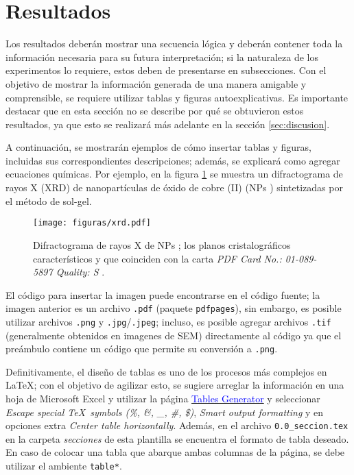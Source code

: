 \section{Resultados} %
\label{sec:resultados} %

Los resultados deberán mostrar una secuencia lógica y deberán contener toda la información necesaria para su futura interpretación; si la naturaleza de los experimentos lo requiere, estos deben de presentarse en subsecciones. Con el objetivo de mostrar la información generada de una manera amigable y comprensible, se requiere utilizar tablas y figuras autoexplicativas. Es importante destacar que en esta sección no se describe por qué se obtuvieron estos resultados, ya que esto se realizará más adelante en la sección \ref{sec:discusion}.

A continuación, se mostrarán ejemplos de cómo insertar tablas y figuras, incluidas sus correspondientes descripciones; además, se explicará como agregar ecuaciones químicas. Por ejemplo, en la figura \ref{fig:xrd} se muestra un difractograma de rayos X (XRD) de nanopartículas de óxido de cobre (II) (NPs ) sintetizadas por el método de sol-gel.

\begin{figure}[ht!]
    \centering
    \texttt{[image: figuras/xrd.pdf]}
    \caption{Difractograma de rayos X de NPs ; los planos cristalográficos característicos y que coinciden con la carta \textit{PDF Card No.: 01-089-5897 Quality: S} .}
    \label{fig:xrd}
\end{figure}

El código para insertar la imagen puede encontrarse en el código fuente; la imagen anterior es un archivo \texttt{.pdf} (paquete \texttt{pdfpages}), sin embargo, es posible utilizar archivos \texttt{.png} y \texttt{.jpg}/\texttt{.jpeg}; incluso, es posible agregar archivos \texttt{.tif} (generalmente obtenidos en imagenes de SEM) directamente al código ya que el preámbulo contiene un código que permite su conversión a \texttt{.png}.

Definitivamente, el diseño de tablas es uno de los procesos más complejos en \LaTeX; con el objetivo de agilizar esto, se sugiere arreglar la información en una hoja de Microsoft Excel y utilizar la página \href{https://www.tablesgenerator.com/}{\textcolor{blue}{Tables Generator}} y seleccionar \textit{Escape special \TeX~symbols (\%, \&, \_, \#, \$)}, \textit{Smart output formatting} y en opciones extra \textit{Center table horizontally}. Además, en el archivo \texttt{0.0\_seccion.tex} en la carpeta \textit{secciones} de esta plantilla se encuentra el formato de tabla deseado. En caso de colocar una tabla que abarque ambas columnas de la página, se debe utilizar el ambiente \texttt{table*}.

